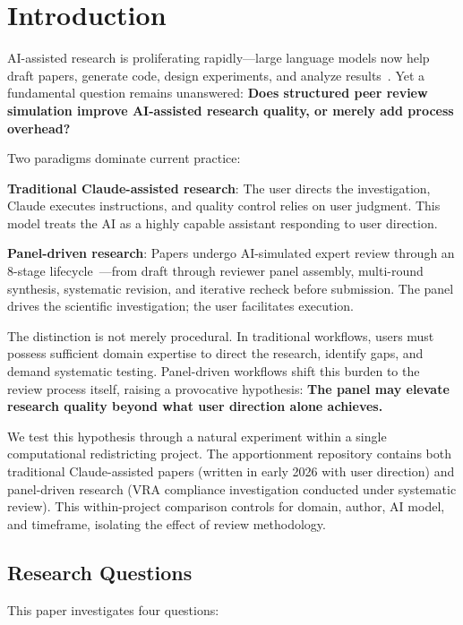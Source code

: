 \section{Introduction}

AI-assisted research is proliferating rapidly---large language models now help draft papers, generate code, design experiments, and analyze results~\cite{zhou2024large}. Yet a fundamental question remains unanswered: \textbf{Does structured peer review simulation improve AI-assisted research quality, or merely add process overhead?}

Two paradigms dominate current practice:

\textbf{Traditional Claude-assisted research}: The user directs the investigation, Claude executes instructions, and quality control relies on user judgment. This model treats the AI as a highly capable assistant responding to user direction.

\textbf{Panel-driven research}: Papers undergo AI-simulated expert review through an 8-stage lifecycle~\cite{dellalibera2026review}---from draft through reviewer panel assembly, multi-round synthesis, systematic revision, and iterative recheck before submission. The panel drives the scientific investigation; the user facilitates execution.

The distinction is not merely procedural. In traditional workflows, users must possess sufficient domain expertise to direct the research, identify gaps, and demand systematic testing. Panel-driven workflows shift this burden to the review process itself, raising a provocative hypothesis: \textbf{The panel may elevate research quality beyond what user direction alone achieves.}

We test this hypothesis through a natural experiment within a single computational redistricting project. The apportionment repository contains both traditional Claude-assisted papers (written in early 2026 with user direction) and panel-driven research (VRA compliance investigation conducted under systematic review). This within-project comparison controls for domain, author, AI model, and timeframe, isolating the effect of review methodology.

\subsection{Research Questions}

This paper investigates four questions:

